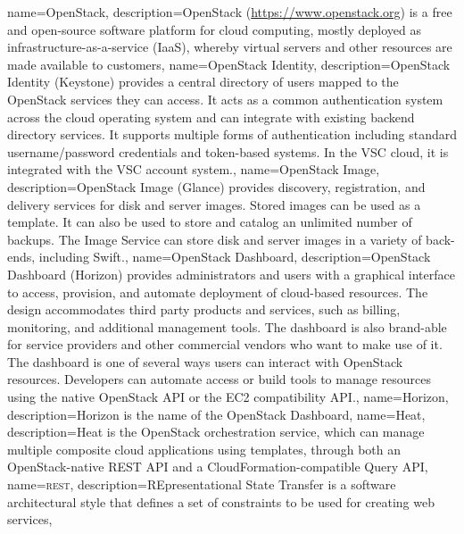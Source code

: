{ name={OpenStack},
  description={OpenStack (\url{https://www.openstack.org}) is a free
    and open-source software platform for cloud computing, mostly
    deployed as infrastructure-as-a-service (IaaS), whereby virtual
    servers and other resources are made available to customers}, }
{ name={OpenStack Identity},
  description={OpenStack Identity (Keystone) provides a central
    directory of users mapped to the OpenStack services they can
    access. It acts as a common authentication system across the cloud
    operating system and can integrate with existing backend directory
    services. It supports multiple forms of authentication including
    standard username/password credentials and token-based systems.
    In the VSC cloud, it is integrated with the VSC account system.},
}
{
  name={OpenStack Image},
  description={OpenStack Image (Glance) provides discovery,
  registration, and delivery services for disk and server images. Stored
  images can be used as a template. It can also be used to store and
  catalog an unlimited number of backups. The Image Service can store
  disk and server images in a variety of back-ends, including Swift.},
}
{
  name={OpenStack Dashboard},
  description={OpenStack Dashboard (Horizon) provides administrators and
  users with a graphical interface to access, provision, and automate
  deployment of cloud-based resources. The design accommodates third
  party products and services, such as billing, monitoring, and
  additional management tools. The dashboard is also brand-able for
  service providers and other commercial vendors who want to make use of
  it. The dashboard is one of several ways users can interact with
  OpenStack resources. Developers can automate access or build tools to
  manage resources using the native OpenStack API or the EC2
  compatibility API.},
}
{
  name={Horizon},
  description={Horizon is the name of the \gls{OpenStack Dashboard}},
}
{
  name={Heat},
  description={Heat is the OpenStack orchestration service, which can
  manage multiple composite cloud applications using templates,
  through both an OpenStack-native \gls{REST} API and a
  CloudFormation-compatible Query API},
}
{
  name={\textsc{rest}},
  description={REpresentational State Transfer is a software
  architectural style that defines a set of constraints to be used for
  creating web services},
}
